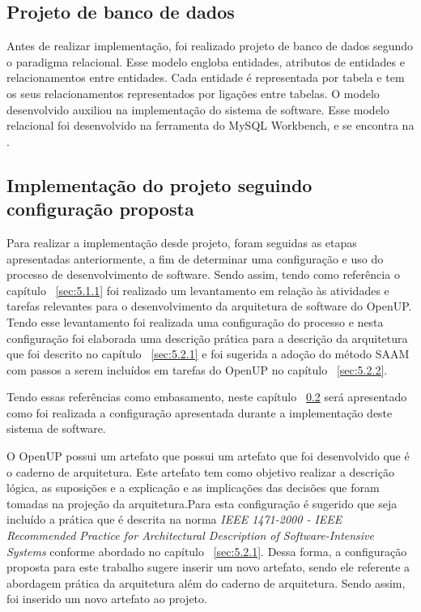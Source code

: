 \subsection{Projeto de banco de dados}
Antes de realizar implementação, foi realizado projeto de banco de dados segundo o paradigma relacional. Esse modelo engloba entidades, atributos de entidades e relacionamentos entre  entidades. Cada entidade é representada por tabela e tem os seus relacionamentos representados por ligações entre tabelas. O modelo desenvolvido auxiliou na implementação do sistema de software. Esse modelo relacional foi desenvolvido na ferramenta do MySQL Workbench, e se encontra na  .


%


\subsection{Implementação do projeto seguindo configuração proposta}
\label{sec:implementação}
Para realizar a implementação desde projeto, foram seguidas as etapas apresentadas anteriormente, a fim de determinar uma configuração e uso do processo de desenvolvimento de software.
Sendo assim, tendo como referência o capítulo  ~\ref{sec:5.1.1} foi realizado um levantamento em relação às atividades e tarefas relevantes para o desenvolvimento da arquitetura de software do \acrfull{OpenUP}. Tendo esse levantamento foi realizada uma configuração do processo e nesta configuração foi elaborada uma descrição prática para a descrição da arquitetura que foi descrito no capítulo ~\ref{sec:5.2.1} e foi sugerida a adoção do método \acrfull{SAAM} com passos a serem incluídos em tarefas do \acrfull{OpenUP} no capítulo ~\ref{sec:5.2.2}. 

Tendo essas referências como embasamento, neste capítulo ~\ref{sec:implementação} será apresentado como foi realizada a configuração apresentada durante a implementação deste sistema de software.

O \acrfull{OpenUP} possui um artefato que possui um artefato que foi desenvolvido que é o caderno de arquitetura. Este artefato tem como objetivo realizar a descrição lógica, as suposições e a explicação e as implicações das decisões que foram tomadas na projeção da arquitetura\cite{openup}.Para esta configuração é sugerido que seja incluído a prática que é descrita na norma \emph{IEEE 1471-2000 - IEEE Recommended Practice for Architectural Description of Software-Intensive Systems} conforme abordado no capítulo ~\ref{sec:5.2.1}. Dessa forma, a configuração proposta para este trabalho sugere inserir um novo artefato, sendo ele referente a abordagem prática da arquitetura além do caderno de arquitetura. Sendo assim, foi inserido um novo artefato ao projeto.

